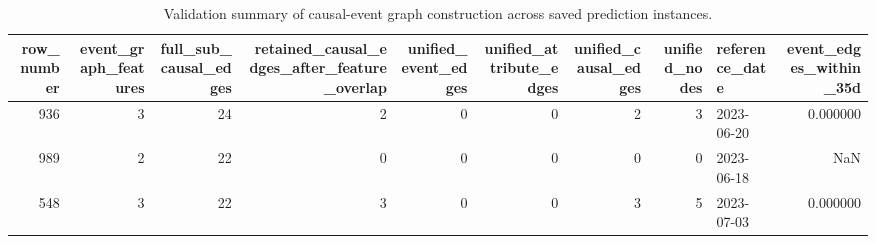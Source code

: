 \begin{table}
\caption{Validation summary of causal-event graph construction across saved prediction instances.}
\label{tab:causal_event_validation}
\begin{tabular}{rrrrrrrrlr}
\toprule
row_number & event_graph_features & full_sub_causal_edges & retained_causal_edges_after_feature_overlap & unified_event_edges & unified_attribute_edges & unified_causal_edges & unified_nodes & reference_date & event_edges_within_35d \\
\midrule
936 & 3 & 24 & 2 & 0 & 0 & 2 & 3 & 2023-06-20 & 0.000000 \\
989 & 2 & 22 & 0 & 0 & 0 & 0 & 0 & 2023-06-18 & NaN \\
548 & 3 & 22 & 3 & 0 & 0 & 3 & 5 & 2023-07-03 & 0.000000 \\
\bottomrule
\end{tabular}
\end{table}
